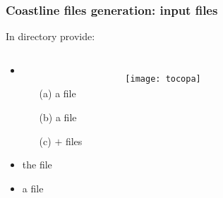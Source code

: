 \begin{frame}[t]
\frametitle{Coastline files generation: input files}

\centerline{In  directory provide:}

\begin{columns}[totalwidth=\textwidth,T]
\vspace*{1cm}
\small{
\begin{itemize}
\item 
\begin{itemize}
\item[(a)] a  file \hfill {}
\item[(b)] a  file \hfill {}
\item[(c)]  $+$  files
\end{itemize}
\item the  file
\item a  file
\end{itemize}
}

\begin{figure}
\centering
\texttt{[image: tocopa]}
\end{figure}

\end{columns}
\end{frame}


